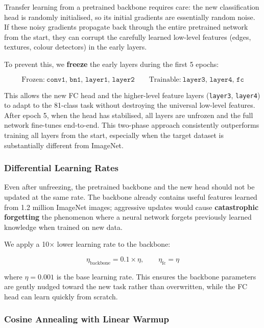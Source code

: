\documentclass[12pt, a4paper]{article}
\begin{document}
Transfer learning from a pretrained backbone requires care: the new
classification head is randomly initialised, so its initial gradients are
essentially random noise.  If these noisy gradients propagate back through the
entire pretrained network from the start, they can corrupt the carefully learned
low-level features (edges, textures, colour detectors) in the early layers.

To prevent this, we \textbf{freeze} the early layers during the first 5 epochs:

\begin{equation}
\text{Frozen:}~ \texttt{conv1, bn1, layer1, layer2} \qquad
\text{Trainable:}~ \texttt{layer3, layer4, fc}
\end{equation}

This allows the new FC head and the higher-level feature layers (\texttt{layer3},
\texttt{layer4}) to adapt to the 81-class task without destroying the universal
low-level features.  After epoch 5, when the head has stabilised, all layers
are unfrozen and the full network fine-tunes end-to-end.  This two-phase approach
consistently outperforms training all layers from the start, especially when the
target dataset is substantially different from ImageNet.

\subsubsection{Differential Learning Rates}

Even after unfreezing, the pretrained backbone and the new head should not be
updated at the same rate.  The backbone already contains useful features learned
from 1.2 million ImageNet images; aggressive updates would cause
\textbf{catastrophic forgetting} the phenomenon where a neural network
forgets previously learned knowledge when trained on new data.

We apply a 10$\times$ lower learning rate to the backbone:

\begin{equation}
\eta_{\text{backbone}} = 0.1 \times \eta, \qquad \eta_{\text{fc}} = \eta
\end{equation}

where $\eta = 0.001$ is the base learning rate.  This ensures the backbone
parameters are gently nudged toward the new task rather than overwritten, while
the FC head can learn quickly from scratch.

\subsubsection{Cosine Annealing with Linear Warmup}
\end{document}
